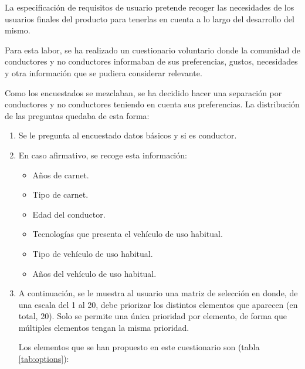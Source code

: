 La especificación de requisitos de usuario pretende recoger las necesidades de
los usuarios finales del producto para tenerlas en cuenta a lo largo del desarrollo
del mismo.

Para esta labor, se ha realizado un cuestionario voluntario donde la comunidad de
conductores y no conductores informaban de sus preferencias, gustos, necesidades y
otra información que se pudiera considerar relevante.

Como los encuestados se mezclaban, se ha decidido hacer una separación por
conductores y no conductores teniendo en cuenta sus preferencias. La distribución
de las preguntas quedaba de esta forma:

\begin{enumerate}
  \item Se le pregunta al encuestado datos básicos y si es conductor.
  \item En caso afirmativo, se recoge esta información:
        \begin{itemize}
          \item Años de carnet.
          \item Tipo de carnet.
          \item Edad del conductor.
          \item Tecnologías que presenta el vehículo de uso habitual.
          \item Tipo de vehículo de uso habitual.
          \item Años del vehículo de uso habitual.
        \end{itemize}
  \item A continuación, se le muestra al usuario una matriz de selección en donde,
        de una escala del 1 al 20, debe priorizar los distintos elementos que aparecen
        (en total, 20). Solo se permite una única prioridad por elemento, de forma que
        múltiples elementos tengan la misma prioridad.

        Los elementos que se han propuesto en este cuestionario son (tabla \ref{tab:options}):


\end{enumerate}

